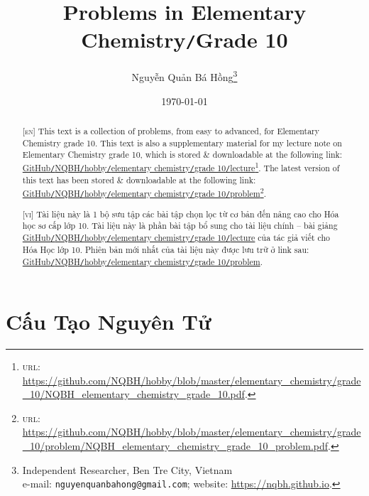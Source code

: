 \documentclass{article}
\title{Problems in Elementary Chemistry\texttt{/}Grade 10}
\author{Nguyễn Quản Bá Hồng\footnote{Independent Researcher, Ben Tre City, Vietnam\\e-mail: \texttt{nguyenquanbahong@gmail.com}; website: \url{https://nqbh.github.io}.}}
\date{\today}
\numberwithin{equation}{section}
\begin{document}
\maketitle
\begin{abstract}
	\textsc{[en]} This text is a collection of problems, from easy to advanced, for Elementary Chemistry grade 10. This text is also a supplementary material for my lecture note on Elementary Chemistry grade 10, which is stored \& downloadable at the following link: \href{https://github.com/NQBH/hobby/blob/master/elementary_chemistry/grade_10/NQBH_elementary_chemistry_grade_10.pdf}{GitHub\texttt{/}NQBH\texttt{/}hobby\texttt{/}elementary chemistry\texttt{/}grade 10\texttt{/}lecture}\footnote{\textsc{url}: \url{https://github.com/NQBH/hobby/blob/master/elementary_chemistry/grade_10/NQBH_elementary_chemistry_grade_10.pdf}.}. The latest version of this text has been stored \& downloadable at the following link: \href{https://github.com/NQBH/hobby/blob/master/elementary_chemistry/grade_10/problem/NQBH_elementary_chemistry_grade_10_problem.pdf}{GitHub\texttt{/}NQBH\texttt{/}hobby\texttt{/}elementary chemistry\texttt{/}grade 10\texttt{/}problem}\footnote{\textsc{url}: \url{https://github.com/NQBH/hobby/blob/master/elementary_chemistry/grade_10/problem/NQBH_elementary_chemistry_grade_10_problem.pdf}.}.
	\vspace{2mm}
	
	\textsc{[vi]} Tài liệu này là 1 bộ sưu tập các bài tập chọn lọc từ cơ bản đến nâng cao cho Hóa học sơ cấp lớp 10. Tài liệu này là phần bài tập bổ sung cho tài liệu chính -- bài giảng \href{https://github.com/NQBH/hobby/blob/master/elementary_chemistry/grade_10/NQBH_elementary_chemistry_grade_10.pdf}{GitHub\texttt{/}NQBH\texttt{/}hobby\texttt{/}elementary chemistry\texttt{/}grade 10\texttt{/}lecture} của tác giả viết cho Hóa Học lớp 10. Phiên bản mới nhất của tài liệu này được lưu trữ ở link sau: \href{https://github.com/NQBH/hobby/blob/master/elementary_chemistry/grade_10/problem/NQBH_elementary_chemistry_grade_10_problem.pdf}{GitHub\texttt{/}NQBH\texttt{/}hobby\texttt{/}elementary chemistry\texttt{/}grade 10\texttt{/}problem}.
\end{abstract}
\tableofcontents
\newpage


\section{Cấu Tạo Nguyên Tử}
\end{document}
